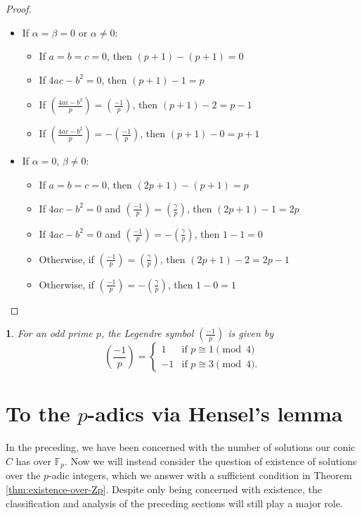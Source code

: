\documentclass[10pt,a4paper]{amsart}
\numberwithin{equation}{section}
\numberwithin{figure}{section}
\theoremstyle{definition}
\theoremstyle{remark}
\theoremstyle{plain}
\theoremstyle{plain}
\theoremstyle{definition}
\theoremstyle{plain}
\newtheorem{prop}{\protect\propositionname}[section]
\theoremstyle{plain}
\providecommand{\propositionname}{Proposition}
\newcommand{\legendre}[2]{\genfrac{(}{)}{}{}{#1}{#2}}
\newcommand{\F}{\mathbb{F}}
\begin{document}
\begin{proof}
\begin{itemize}
\item If $\alpha=\beta=0$ or $\alpha\ne 0$:
\begin{itemize}
\item If $a=b=c=0$, then $(p+1)-(p+1)=0$
\item If $4ac-b^2=0$, then $(p+1)-1=p$
\item If $\legendre{4ac-b^2}{p}=\legendre{-1}{p}$, then $(p+1)-2=p-1$
\item If $\legendre{4ac-b^2}{p}=-\legendre{-1}{p}$, then $(p+1)-0=p+1$
\end{itemize}
\item If $\alpha=0$, $\beta\ne 0$:
\begin{itemize}
\item If $a=b=c=0$, then $(2p+1)-(p+1)=p$
\item If $4ac-b^2=0$ and $\legendre{-1}{p}=\legendre{\gamma}{p}$, then $(2p+1)-1=2p$
\item If $4ac-b^2=0$ and $\legendre{-1}{p}=-\legendre{\gamma}{p}$, then $1-1=0$
\item Otherwise, if $\legendre{-1}{p}=\legendre{\gamma}{p}$, then $(2p+1)-2=2p-1$
\item Otherwise, if $\legendre{-1}{p}=-\legendre{\gamma}{p}$, then $1-0=1$
\end{itemize}
\end{itemize}
\end{proof}

    \begin{prop} 
        For an odd prime $p$, the Legendre symbol $\legendre{-1}{p}$ is
        given by 
        \[ \legendre{-1}{p} = \begin{cases} 
            1 & \text{if } p \cong 1 \pmod 4 \\ 
            -1 & \text{if } p \cong 3 \pmod 4.  
        \end{cases} \]
    \end{prop}

    \section{To the $p$-adics via Hensel's lemma}
	In the preceding, we have been concerned with the number of solutions our conic $C$ has over $\F_p$. Now we will instead consider the question of existence of solutions over the $p$-adic integers, which we answer with a sufficient condition in Theorem \ref{thm:existence-over-Zp}. Despite only being concerned with existence, the classification and analysis of the preceding sections will still play a major role.
	
\end{document}

